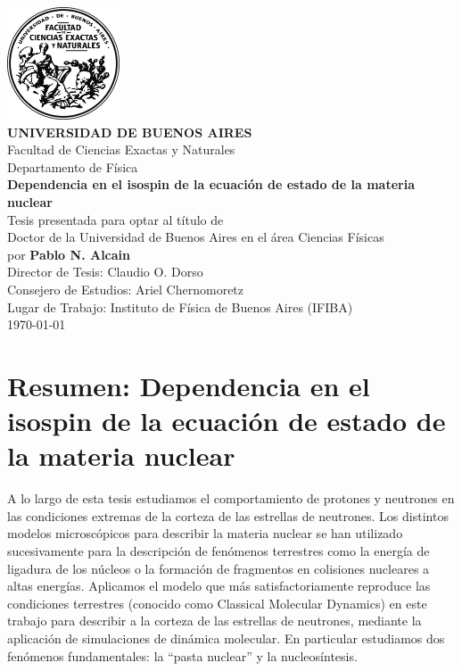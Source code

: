 \documentclass[12pt]{book}
\begin{document}
\frontmatter
\thispagestyle{empty}
\begin{center}
\large{
\includegraphics[width=0.25\textwidth]{logo.png}\vspace{1cm}\\
\textbf{UNIVERSIDAD DE BUENOS AIRES}\\
Facultad de Ciencias Exactas y Naturales\\
Departamento de Física\vspace{1.5cm}\\
\textbf{\LARGE Dependencia en el isospin de la ecuación de estado de la materia nuclear}
\vspace{0.5cm}\\
Tesis presentada para optar al título de \\
Doctor de la Universidad de Buenos Aires en el área Ciencias Físicas\\
por \textbf{Pablo N. Alcain} \vspace{1.5cm}\\
Director de Tesis: Claudio O. Dorso\\
Consejero de Estudios: Ariel Chernomoretz\\
Lugar de Trabajo: Instituto de Física de Buenos Aires (IFIBA)
\vspace{1.5cm}\\
\today
}
\end{center}

\newpage

\section*{Resumen: Dependencia en el isospin de la ecuación de estado de la materia nuclear}
A lo largo de esta tesis estudiamos el comportamiento de protones y neutrones en las condiciones extremas de la corteza de las estrellas de neutrones.
Los distintos modelos microscópicos para describir la materia nuclear se han utilizado sucesivamente para la descripción de fenómenos terrestres como la energía de ligadura de los núcleos o la formación de fragmentos en colisiones nucleares a altas energías.
Aplicamos el modelo que más satisfactoriamente reproduce las condiciones terrestres (conocido como Classical Molecular Dynamics) en este trabajo para describir a la corteza de las estrellas de neutrones, mediante la aplicación de simulaciones de dinámica molecular.
En particular estudiamos dos fenómenos fundamentales: la ``pasta nuclear'' y la nucleosíntesis.
\end{document}
